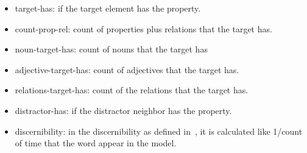 \begin{itemize}
\item target-has: if the target element has the property.
\item count-prop-rel: count of properties plus relations that the target has.
\item noun-target-has: count of nouns that the target has
\item adjective-target-has: count of adjectives that the target has.
\item relations-target-has: count of the relations that the target has.
\item distractor-has: if the distractor neighbor has the property.
\item discernibility: in the discernibility as defined in~\cite{gatt:nond11}, it is calculated like 1/count of time that the word appear in the model.
\end{itemize}



